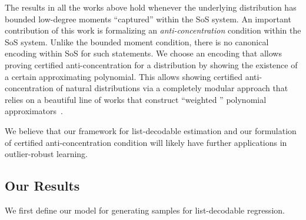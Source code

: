 The results in all the works above hold whenever the underlying distribution has bounded low-degree moments ``captured'' within the SoS system. An important contribution of this work is formalizing an \emph{anti-concentration} condition within the SoS system. Unlike the bounded moment condition, there is no canonical encoding  within SoS for such statements. We choose an encoding that allows proving certified anti-concentration for a distribution by showing the existence of a certain approximating polynomial. This allows showing certified anti-concentration of natural distributions via a completely modular approach that relies on a beautiful line of works that construct ``weighted '' polynomial approximators~\cite{2007math......1099L}. 

We believe that our framework for list-decodable estimation and our formulation of certified anti-concentration condition will likely have further applications in outlier-robust learning. 
\subsection{Our Results}
We first define our model for generating samples for list-decodable regression.

